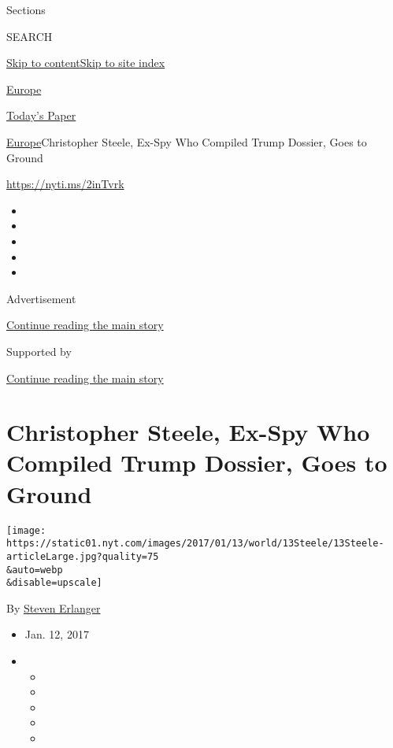 Sections

SEARCH

\protect\hyperlink{site-content}{Skip to
content}\protect\hyperlink{site-index}{Skip to site index}

\href{https://www.nytimes.com/section/world/europe}{Europe}

\href{https://myaccount.nytimes.com/auth/login?response_type=cookie\&client_id=vi}{}

\href{https://www.nytimes.com/section/todayspaper}{Today's Paper}

\href{/section/world/europe}{Europe}\textbar{}Christopher Steele, Ex-Spy
Who Compiled Trump Dossier, Goes to Ground

\url{https://nyti.ms/2inTvrk}

\begin{itemize}
\item
\item
\item
\item
\item
\end{itemize}

Advertisement

\protect\hyperlink{after-top}{Continue reading the main story}

Supported by

\protect\hyperlink{after-sponsor}{Continue reading the main story}

\hypertarget{christopher-steele-ex-spy-who-compiled-trump-dossier-goes-to-ground}{%
\section{Christopher Steele, Ex-Spy Who Compiled Trump Dossier, Goes to
Ground}\label{christopher-steele-ex-spy-who-compiled-trump-dossier-goes-to-ground}}

\texttt{[image: https://static01.nyt.com/images/2017/01/13/world/13Steele/13Steele-articleLarge.jpg?quality=75\\\&auto=webp\\\&disable=upscale]}

By \href{http://www.nytimes.com/by/steven-erlanger}{Steven Erlanger}

\begin{itemize}
\item
  Jan. 12, 2017
\item
  \begin{itemize}
  \item
  \item
  \item
  \item
  \item
  \end{itemize}
\end{itemize}

